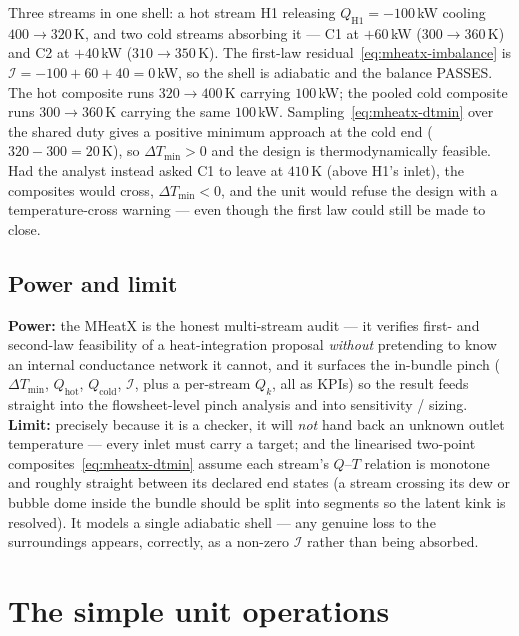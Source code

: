 \documentclass[11pt,a4paper]{article}
\begin{document}
Three streams in one shell: a hot stream H1 releasing
$Q_{\text{H1}} = -100$\,kW cooling $400\to 320$\,K, and two cold streams
absorbing it --- C1 at $+60$\,kW ($300\to 360$\,K) and C2 at $+40$\,kW
($310\to 350$\,K).  The first-law residual~\eqref{eq:mheatx-imbalance} is
$\mathcal I = -100 + 60 + 40 = 0$\,kW, so the shell is adiabatic and the
balance PASSES.  The hot composite runs $320\to400$\,K carrying
$100$\,kW; the pooled cold composite runs $300\to360$\,K carrying the
same $100$\,kW.  Sampling~\eqref{eq:mheatx-dtmin} over the shared duty
gives a positive minimum approach at the cold end ($320 - 300 = 20$\,K),
so $\Delta T_{\min} > 0$ and the design is thermodynamically feasible.
Had the analyst instead asked C1 to leave at $410$\,K (above H1's inlet),
the composites would cross, $\Delta T_{\min} < 0$, and the unit would
refuse the design with a temperature-cross warning --- even though the
first law could still be made to close.

\subsection{Power and limit}

\textbf{Power:} the MHeatX is the honest multi-stream audit --- it
verifies first- and second-law feasibility of a heat-integration proposal
\emph{without} pretending to know an internal conductance network it
cannot, and it surfaces the in-bundle pinch ($\Delta T_{\min}$,
$Q_{\text{hot}}$, $Q_{\text{cold}}$, $\mathcal I$, plus a per-stream
$Q_k$, all as KPIs) so the result feeds straight into the
flowsheet-level pinch analysis and into sensitivity / sizing.
\textbf{Limit:} precisely because it is a checker, it will \emph{not}
hand back an unknown outlet temperature --- every inlet must carry a
target; and the linearised two-point composites~\eqref{eq:mheatx-dtmin}
assume each stream's $Q$--$T$ relation is monotone and roughly straight
between its declared end states (a stream crossing its dew or bubble dome
inside the bundle should be split into segments so the latent kink is
resolved).  It models a single adiabatic shell --- any genuine loss to
the surroundings appears, correctly, as a non-zero $\mathcal I$ rather
than being absorbed.

\section{The simple unit operations}\label{ch:simple-ops}
\end{document}
